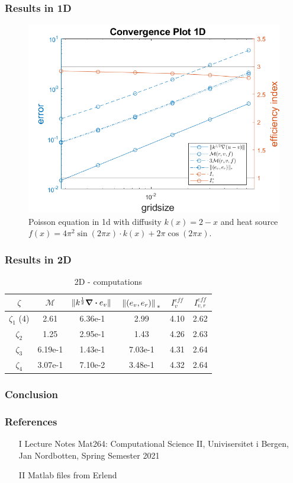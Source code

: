 \documentclass[t]{beamer}
\begin{document}
\begin{frame}
\frametitle{Results in 1D }
\vspace{-18pt}
\begin{figure}[t]
\centering
\includegraphics[width = 0.7\linewidth]{convergenceplot_k_f_non_constant.png}
\caption{Poisson equation in 1d with diffusity $k(x) = 2-x$ and heat source $f(x) = 4\pi^2\sin(2\pi x)\cdot k(x) + 2\pi\cos(2\pi x)$.}
\label{fig:Convergence1d}
\end{figure}

\end{frame}

\begin{frame}[c]
    \frametitle{Results in 2D}
    \begin{table}[c]
          \begin{tabular}{c | c | c | c | c | c } 
            $\zeta$ & $\mathcal{M}$  & $\norm*{k^{\frac{1}{2}}\div e_v}$ & $\norm*{(e_v,e_r)}_{*}$ & $I_v^{eff}$ & $I_{v,r}^{eff}$ \\
            \hline \hline
            $\zeta_1$ (4) & 2.61 & 6.36e-1 & 2.99 & 4.10 & 2.62 \\ 
            $\zeta_2$ & 1.25 & 2.95e-1 & 1.43 & 4.26 & 2.63 \\
            $\zeta_3$ & 6.19e-1 & 1.43e-1& 7.03e-1 & 4.31 & 2.64 \\
            $\zeta_4$ & 3.07e-1 & 7.10e-2 & 3.48e-1 & 4.32 & 2.64 \\
          \end{tabular}
          \caption{2D - computations}
      \end{table}

\end{frame}

\begin{frame}
\frametitle{Conclusion}

\end{frame}

\begin{frame}
\frametitle{References}
\begin{enumerate}
\item[I] Lecture Notes Mat264: Computational Science II, Univisersitet i Bergen, Jan Nordbotten, Spring Semester 2021
\item[II] Matlab files from Erlend
\end{enumerate}
\end{frame}
\end{document}
